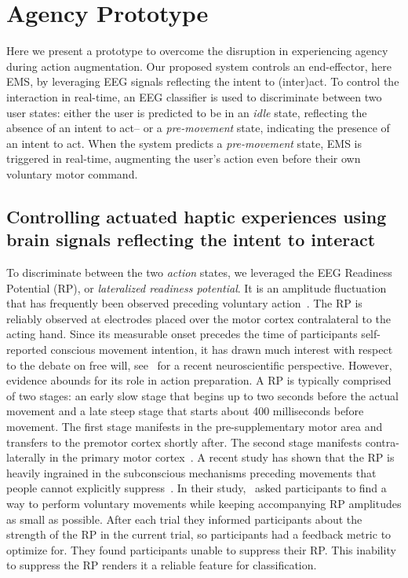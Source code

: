 \section{Agency Prototype}
Here we present a prototype to overcome the disruption in experiencing agency during action augmentation. Our proposed system controls an end-effector, here EMS, by leveraging EEG signals reflecting the intent to (inter)act. To control the interaction in real-time, an EEG classifier is used to discriminate between two user states: either the user is predicted to be in an \textit{idle} state, reflecting the absence of an intent to act-- or a \textit{pre-movement} state, indicating the presence of an intent to act. When the system predicts a \textit{pre-movement} state, EMS is triggered in real-time, augmenting the user's action even before their own voluntary motor command.

\subsection{Controlling actuated haptic experiences using brain signals reflecting the intent to interact}

To discriminate between the two \textit{action} states, we leveraged the EEG Readiness Potential (RP), or \textit{lateralized readiness potential}. It is an amplitude fluctuation that has frequently been observed preceding voluntary action~\cite{Deecke1969-bl, Libet1983-qu}. The RP is reliably observed at electrodes placed over the motor cortex contralateral to the acting hand. Since its measurable onset precedes the time of participants self-reported conscious movement intention, it has drawn much interest with respect to the debate on free will, see~\cite{Schurger2021-vp} for a recent neuroscientific perspective. However, evidence abounds for its role in action preparation. A RP is typically comprised of two stages: an early slow stage that begins up to two seconds before the actual movement and a late steep stage that starts about 400 milliseconds before movement. The first stage manifests in the pre-supplementary motor area and transfers to the premotor cortex shortly after. The second stage manifests contra-laterally in the primary motor cortex~\cite{Shibasaki2006-mt}. A recent study has shown that the RP is heavily ingrained in the subconscious mechanisms preceding movements that people cannot explicitly suppress~\cite{Schultze-Kraft2021-cu}. In their study,~\cite{Schultze-Kraft2021-cu} asked participants to find a way to perform voluntary movements while keeping accompanying RP amplitudes as small as possible. After each trial they informed participants about the strength of the RP in the current trial, so participants had a feedback metric to optimize for. They found participants unable to suppress their RP. This inability to suppress the RP renders it a reliable feature for classification.

